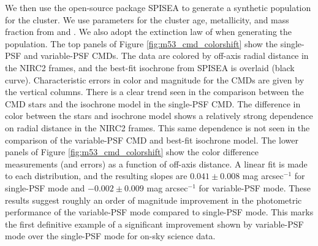 \documentclass[]{spie}  %
\begin{document}
\indent We then use the open-source package SPISEA \citep{hosek:2020a} to generate a synthetic population for the cluster. We use parameters for the cluster age, metallicity, and mass fraction from \cite{dotter:2011a} and \cite{wagner:2016a}. We also adopt the extinction law of \cite{schlafly:2016a} when generating the population. The top panels of Figure \ref{fig:m53_cmd_colorshift} show the single-PSF and variable-PSF CMDs. The data are colored by off-axis radial distance in the NIRC2 frames, and the best-fit isochrone from SPISEA is overlaid (black curve). Characteristic errors in color and magnitude for the CMDs are given by the vertical columns. There is a clear trend seen in the comparison between the CMD stars and the isochrone model in the single-PSF CMD. The difference in color between the stars and isochrone model shows a relatively strong dependence on radial distance in the NIRC2 frames. This same dependence is not seen in the comparison of the variable-PSF CMD and best-fit isochrone model. The lower panels of Figure \ref{fig:m53_cmd_colorshift} show the color difference measurements (and errors) as a function of off-axis distance. A linear fit is made to each distribution, and the resulting slopes are $0.041 \pm 0.008$ mag arcsec$^{-1}$ for single-PSF mode and $-0.002 \pm 0.009$ mag arcsec$^{-1}$ for variable-PSF mode. These results suggest roughly an order of magnitude improvement in the photometric performance of the variable-PSF mode compared to single-PSF mode. This marks the first definitive example of a significant improvement shown by variable-PSF mode over the single-PSF mode for on-sky science data.
\end{document}
